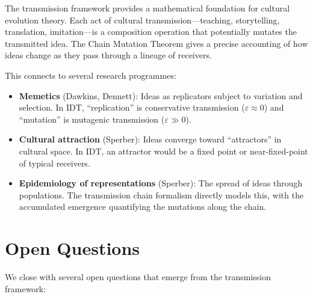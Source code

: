 \begin{interpretation}
The transmission framework provides a mathematical foundation for
cultural evolution theory. Each act of cultural transmission---teaching,
storytelling, translation, imitation---is a composition operation that
potentially mutates the transmitted idea. The Chain Mutation Theorem
gives a precise accounting of how ideas change as they pass through
a lineage of receivers.

This connects to several research programmes:
\begin{itemize}
    \item \textbf{Memetics} (Dawkins, Dennett): Ideas as replicators
    subject to variation and selection. In IDT, ``replication'' is
    conservative transmission ($\varepsilon \approx 0$) and ``mutation''
    is mutagenic transmission ($\varepsilon \gg 0$).

    \item \textbf{Cultural attraction} (Sperber): Ideas converge toward
    ``attractors'' in cultural space. In IDT, an attractor would be
    a fixed point or near-fixed-point of typical receivers.

    \item \textbf{Epidemiology of representations} (Sperber): The spread
    of ideas through populations. The transmission chain formalism
    directly models this, with the accumulated emergence quantifying
    the mutations along the chain.
\end{itemize}
\end{interpretation}

\section{Open Questions}

We close with several open questions that emerge from the transmission
framework:

